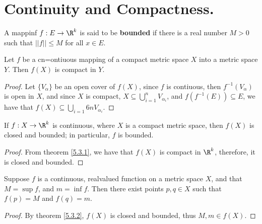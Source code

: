 
\section{Continuity and Compactness.}

\begin{definition}
    A mappinf $f:E \rightarrow \R^k$ is said to be \textbf{bounded} if there is a real number $M>0$ 
    such that  $||f|| \leq M$ for all  $x \in E$.
\end{definition}

\begin{theorem}\label{5.3.1}
    Let $f$ be a cn=ontiuous mapping of a compact metric space  $X$ into a metric space  
    $Y$. Then  $f(X)$ is compact in  $Y$.
\end{theorem}
\begin{proof}
    Let $\{V_{\alpha}\}$ be an open cover of  $f(X)$, since $f$ is contiuous, then  $f^{-1}(V_{\alpha})$ 
    is open in  $X$, and since  $X$ is compact,  $X \subseteq \bigcup_{i=1}^{n}{V_{\alpha_i}}$, and 
    $f(f^{-1}(E)) \subseteq E$, we have that  $f(X) \subseteq \bigcup_{i=1}6{n}{V_{\alpha_i}}$.
\end{proof}

\begin{theorem}\label{5.3.2}
    If $f:X \rightarrow \R^k$ is continuous, where  $X$ is a compact metric space, then  $f(X)$ 
    is closed and bounded; in particular, $f$ is bounded.
\end{theorem}
\begin{proof}
    From theorem \ref{5.3.1}, we have that $f(X)$ is compact in  $\R^k$, therefore, it is 
    closed and bounded.
\end{proof}

\begin{theorem}\label{5.3.3}
    Suppose $f$ is a continuous, realvalued function on a metric space $X$, and that  \
    $M=\sup{f}$, and  $m=\inf{f}$. Then there exist points  $p,q \in X$ such that  $f(p)=M$ 
    and  $f(q)=m$.
\end{theorem}
\begin{proof}
    By theorem \ref{5.3.2}, $f(X)$ is closed and bounded, thus  $M,m \in f(X)$.
\end{proof}

